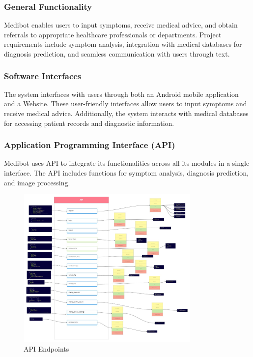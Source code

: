 \subsubsection{General Functionality}
Medibot enables users to input symptoms, receive medical advice, and obtain referrals to appropriate healthcare professionals or departments. Project requirements include symptom analysis, integration with medical databases for diagnosis prediction, and seamless communication with users through text.

\subsubsection{Software Interfaces}
The system interfaces with users through both an Android mobile application and a Website. These user-friendly interfaces allow users to input symptoms and receive medical advice. Additionally, the system interacts with medical databases for accessing patient records and diagnostic information.

\subsubsection{Application Programming Interface (API)}
Medibot uses API to integrate its functionalities across all its modules in a single interface. The API includes functions for symptom analysis, diagnosis prediction, and image processing.

\begin{figure}[H] 
    \centering
    \includegraphics[width=0.8\textwidth]{./Figures/api.jpg} 
    \caption{API Endpoints} 
    \label{fig:mysvg2}
\end{figure}

